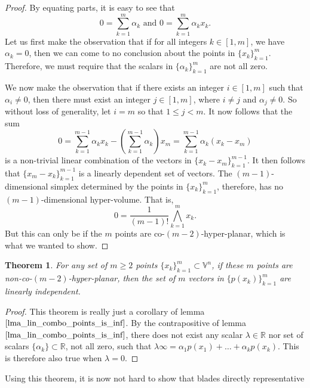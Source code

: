 \documentclass[12pt]{article}
\newcommand{\V}{\mathbb{V}}
\newcommand{\R}{\mathbb{R}}
\newcommand{\nvai}{\infty}
\newtheorem{theorem}{Theorem}[section]
\begin{document}
\begin{proof}
By equating parts, it is easy to see that
\begin{equation*}
\mbox{$\displaystyle{0=\sum_{k=1}^m\alpha_k}$ and $\displaystyle{0=\sum_{k=1}^m\alpha_k x_k}$.}
\end{equation*}
Let us first make the observation that if for all integers $k\in[1,m]$, we have
$\alpha_k=0$, then we can come to no conclusion about the points in $\{x_k\}_{k=1}^m$.
Therefore, we must require that the scalars in $\{\alpha_k\}_{k=1}^m$ are not
all zero.

We now make the observation that if there exists an integer $i\in[1,m]$ such that
$\alpha_i\neq 0$, then there must exist an integer $j\in[1,m]$, where $i\neq j$ and
$\alpha_j\neq 0$.
So without loss of generality, let $i=m$ so that $1\leq j<m$.
It now follows that the sum
\begin{equation*}
0 = \sum_{k=1}^{m-1}\alpha_k x_k - \left(\sum_{k=1}^{m-1}\alpha_k\right)x_m
 = \sum_{k=1}^{m-1}\alpha_k(x_k-x_m)
\end{equation*}
is a non-trivial linear combination of the vectors in $\{x_k-x_m\}_{k=1}^{m-1}$.
It then follows that $\{x_m-x_k\}_{k=1}^{m-1}$ is a linearly dependent set of vectors.
The $(m-1)$-dimensional simplex determined by the points in $\{x_k\}_{k=1}^m$, therefore,
has no $(m-1)$-dimensional hyper-volume.  That is,
\begin{equation*}
0=\frac{1}{(m-1)!}\bigwedge_{k=1}^m x_k.
\end{equation*}
But this can only be if the $m$ points are co-$(m-2)$-hyper-planar,
which is what we wanted to show.
\end{proof}
\begin{theorem}\label{thm_fit_round}
For any set of $m\geq 2$ points $\{x_k\}_{k=1}^m\subset\V^n$, if these
$m$ points are non-co-$(m-2)$-hyper-planar, then the set of $m$ vectors in $\{p(x_k)\}_{k=1}^m$
are linearly independent.
\end{theorem}
\begin{proof}
This theorem is really just a corollary of lemma $\eqref{lma_lin_combo_points_is_inf}$.
By the contrapositive of lemma $\eqref{lma_lin_combo_points_is_inf}$, there does not
exist any scalar $\lambda\in\R$ nor set of scalars $\{\alpha_k\}\subset\R$, not all zero, such
that $\lambda\nvai = \alpha_1 p(x_1)+\dots+\alpha_kp(x_k)$.  This is therefore also true when $\lambda=0$.
\end{proof}
Using this theorem, it is now not hard to show that blades directly representative
\end{document}
